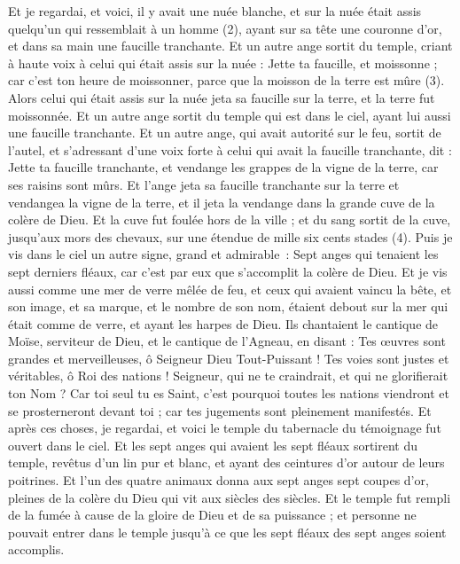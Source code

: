 \begin{multicols}{2}
Et je regardai, et voici, il y avait une nuée blanche, et sur la nuée était assis quelqu'un qui ressemblait à un homme (2), ayant sur sa tête une couronne d'or, et dans sa main une faucille tranchante.
Et un autre ange sortit du temple, criant à haute voix à celui qui était assis sur la nuée : Jette ta faucille, et moissonne ; car c'est ton heure de moissonner, parce que la moisson de la terre est mûre (3).
Alors celui qui était assis sur la nuée jeta sa faucille sur la terre, et la terre fut moissonnée.
Et un autre ange sortit du temple qui est dans le ciel, ayant lui aussi une faucille tranchante.
Et un autre ange, qui avait autorité sur le feu, sortit de l'autel, et s’adressant d’une voix forte à celui qui avait la faucille tranchante, dit : Jette ta faucille tranchante, et vendange les grappes de la vigne de la terre, car ses raisins sont mûrs.
Et l'ange jeta sa faucille tranchante sur la terre et vendangea la vigne de la terre, et il jeta la vendange dans la grande cuve de la colère de Dieu.
Et la cuve fut foulée hors de la ville ; et du sang sortit de la cuve, jusqu’aux mors des chevaux, sur une étendue de mille six cents stades (4).
\VerseOne{}Puis je vis dans le ciel un autre signe, grand et admirable : Sept anges qui tenaient les sept derniers fléaux, car c'est par eux que s’accomplit la colère de Dieu.
Et je vis aussi comme une mer de verre mêlée de feu, et ceux qui avaient vaincu la bête, et son image, et sa marque, et le nombre de son nom, étaient debout sur la mer qui était comme de verre, et ayant les harpes de Dieu.
Ils chantaient le cantique de Moïse, serviteur de Dieu, et le cantique de l'Agneau, en disant : Tes œuvres sont grandes et merveilleuses, ô Seigneur Dieu Tout-Puissant ! Tes voies sont justes et véritables, ô Roi des nations !
Seigneur, qui ne te craindrait, et qui ne glorifierait ton Nom ? Car toi seul tu es Saint, c'est pourquoi toutes les nations viendront et se prosterneront devant toi ; car tes jugements sont pleinement manifestés.
Et après ces choses, je regardai, et voici le temple du tabernacle du témoignage fut ouvert dans le ciel.
Et les sept anges qui avaient les sept fléaux sortirent du temple, revêtus d'un lin pur et blanc, et ayant des ceintures d’or autour de leurs poitrines.
Et l'un des quatre animaux donna aux sept anges sept coupes d'or, pleines de la colère du Dieu qui vit aux siècles des siècles.
Et le temple fut rempli de la fumée à cause de la gloire de Dieu et de sa puissance ; et personne ne pouvait entrer dans le temple jusqu'à ce que les sept fléaux des sept anges soient accomplis.

\end{multicols}
